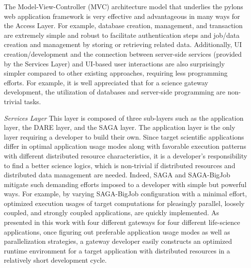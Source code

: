 \documentclass{sig-alternate}
\begin{document}
The Model-View-Controller (MVC) architecture model that underlies the pylons web application framework is very effective and advantageous in many ways for the Access Layer. For example, database creation, management, and transaction are extremely simple and robust to facilitate authentication steps and job/data creation and management by storing or retrieving related data.  Additionally, UI creation/development and the connection between server-side services (provided by the Services Layer) and UI-based user interactions are also surprisingly simpler compared to other existing approaches, requiring less programming efforts.  For example, it is well appreciated that for a science gateway development, the utilization of databases and server-side programming are non-trivial tasks.         

\textit{Services Layer}
This layer is composed of three sub-layers such as the application layer, the DARE layer, and the SAGA layer.  The application layer is the only layer requiring a developer to build their own.  Since target scientific applications differ in optimal application usage modes along with favorable execution patterns with different distributed resource characteristics, it is a developer's responsibility to find a better science logics, which is non-trivial if distributed resources and distributed data management are needed.  Indeed, SAGA and SAGA-BigJob mitigate such demanding efforts imposed to a developer with simple but powerful ways.  For example, by varying SAGA-BigJob configuration with a minimal effort, optimized execution usages of target computations for pleasingly parallel, loosely coupled, and strongly coupled applications, are quickly implemented.  As presented in this work with four different gateways for four different life-science applications, once figuring out preferable application usage modes as well as parallelization strategies, a gateway developer easily constructs an optimized runtime environment for a target application with distributed resources in a relatively short development cycle.   


\end{document}
